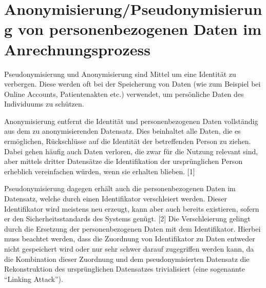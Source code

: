\chapter{Anonymisierung/Pseudonymisierung von personenbezogenen Daten im Anrechnungsprozess}

Pseudonymisierung und Anonymisierung sind Mittel um eine Identität zu verbergen. 
Diese werden oft bei der Speicherung von Daten (wie zum Beispiel bei Online Accounts, Patientenakten etc.) verwendet, um persönliche Daten des Individuums zu schützen. 

Anonymisierung entfernt die Identität und personenbezogenen Daten vollständig aus dem zu anonymisierenden Datensatz. Dies beinhaltet alle Daten, die es ermöglichen, Rückschlüsse auf die Identität der betreffenden Person zu ziehen. Dabei gehen häufig auch Daten verloren, die zwar für die Nutzung relevant sind, aber mittels dritter Datensätze die Identifikation der ursprünglichen Person erheblich vereinfachen würden, wenn sie erhalten blieben.  [1]

Pseudonymisierung dagegen erhält auch die personenbezogenen Daten im Datensatz, welche durch einen Identifikator verschleiert werden. Dieser Identifikator wird meistens neu erzeugt, kann aber auch bereits existieren, sofern er den Sicherheitsstandards des Systems genügt. [2]
Die Verschleierung gelingt durch die Ersetzung der personenbezogenen Daten mit dem Identifikator. Hierbei muss beachtet werden, dass die Zuordnung von Identifikator zu Daten entweder nicht gespeichert wird oder nur sehr schwer darauf zugegriffen werden kann, da die Kombination dieser Zuordnung und dem pseudonymisierten Datensatz die Rekonstruktion des ursprünglichen Datensatzes trivialisiert (eine sogenannte “Linking Attack”).

